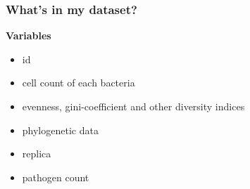 \documentclass[11pt]{beamer}
\begin{document}
\begin{frame}
\frametitle{What's in my dataset?}
\textbf{Variables}
\begin{itemize}
\item id
\item cell count of each bacteria
\item evenness, gini-coefficient and other diversity indices
\item phylogenetic data
\item replica
\item pathogen count
\end{itemize}
\end{frame}

\end{document}
